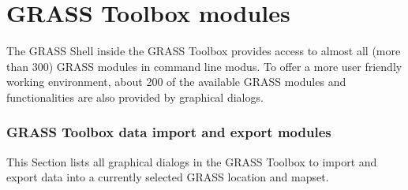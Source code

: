 \section{GRASS Toolbox modules}\label{appdx_grass_toolbox_modules}


The GRASS Shell inside the GRASS Toolbox provides access to almost all (more 
than 300) GRASS modules in command line modus. To offer a more user
friendly working environment, about 200 of the available GRASS modules and 
functionalities are also provided by graphical dialogs.

\subsubsection{GRASS Toolbox data import and export modules}

This Section lists all graphical dialogs in the GRASS Toolbox to import and
export data into a currently selected GRASS location and mapset.

